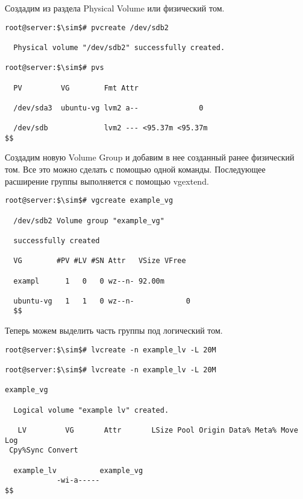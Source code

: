 \documentclass[14pt, a4paper]{article}
\begin{document}
\newpage

Создадим из раздела Physical Volume или физический том.
\vspace{0.3cm}

\begin{lstlisting}
root@server:$\sim$# pvcreate /dev/sdb2

  Physical volume "/dev/sdb2" successfully created.

root@server:$\sim$# pvs

  PV         VG        Fmt Attr

  /dev/sda3  ubuntu-vg lvm2 a--              0

  /dev/sdb             lvm2 --- <95.37m <95.37m
$$
\end{lstlisting}
\vspace{0.2cm}

Создадим новую Volume Group и добавим в нее созданный ранее физический том. Все это можно
сделать с помощью одной команды. Последующее расширение группы выполняется с помощью
\colorbox{backcolour}{vgextend}.

\vspace{0.3cm}

\begin{lstlisting}
root@server:$\sim$# vgcreate example_vg
  
  /dev/sdb2 Volume group "example_vg"
  
  successfully created

  VG        #PV #LV #SN Attr   VSize VFree

  exampl      1   0   0 wz--n- 92.00m

  ubuntu-vg   1   1   0 wz--n-            0
  $$
\end{lstlisting}
\vspace{0.2cm}

Теперь можем выделить часть группы под логический том.
\vspace{0.3cm}

\begin{lstlisting}
root@server:$\sim$# lvcreate -n example_lv -L 20M

root@server:$\sim$# lvcreate -n example_lv -L 20M

example_vg

  Logical volume "example lv" created.

   LV         VG       Attr       LSize Pool Origin Data% Meta% Move Log
 Cpy%Sync Convert

  example_lv          example_vg
            -wi-a-----
$$
\end{lstlisting}
\vspace{0.2cm}
\end{document}
